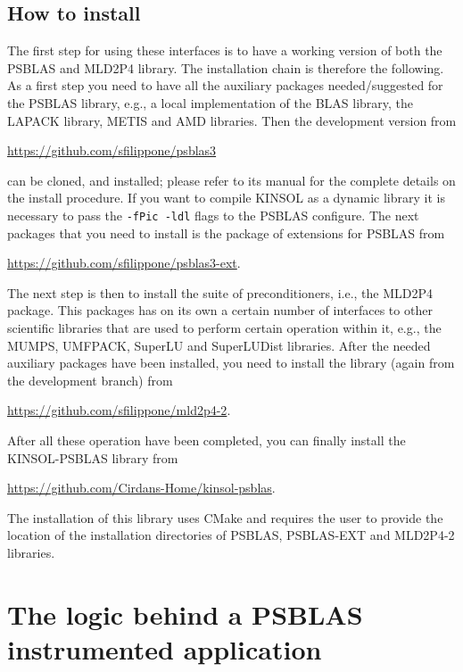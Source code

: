 \documentclass[twoside,a4paper]{refart}
\theoremstyle{definition}
\begin{document}
	\subsection{How to install}
	
	The first step for using these interfaces is to have a working version of both the PSBLAS and MLD2P4 library. The installation chain is therefore the following. As a first step you need to have all the auxiliary packages needed/suggested for the PSBLAS library, e.g., a local implementation of the BLAS library, the LAPACK library, METIS and AMD libraries. Then the development version from
	\begin{center}
		\url{https://github.com/sfilippone/psblas3}
	\end{center}
	can be cloned, and installed; please refer to its manual for the complete details on the install procedure. \attention If you want to compile KINSOL as a dynamic library it is necessary to pass the \lstinline|-fPic -ldl| flags to the PSBLAS configure. The next packages that you need to install is the package of extensions for PSBLAS from
	\begin{center}
		\url{https://github.com/sfilippone/psblas3-ext}.
	\end{center}
	The next step is then to install the suite of preconditioners, i.e., the MLD2P4 package. This packages has on its own a certain number of interfaces to other scientific libraries that are used to perform certain operation within it, e.g., the MUMPS, UMFPACK, SuperLU and SuperLUDist libraries. After the needed auxiliary packages have been installed, you need to install the library (again from the development branch) from
	\begin{center}
		\url{https://github.com/sfilippone/mld2p4-2}.
	\end{center}

	After all these operation have been completed, you can finally install the KINSOL-PSBLAS library from
	\begin{center}
		\url{https://github.com/Cirdans-Home/kinsol-psblas}.
	\end{center}
	The installation of this library uses CMake and requires the user to provide the location of the installation directories of PSBLAS, PSBLAS-EXT and MLD2P4-2 libraries.

		
	\section{The logic behind a PSBLAS instrumented application}
	
\end{document}
